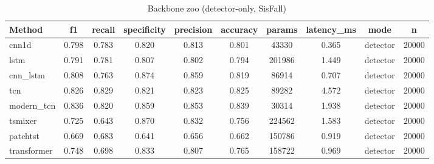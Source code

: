 \begin{table}[t]
\centering
\caption{Backbone zoo (detector-only, SisFall)}
\begin{tabular}{lccccccccc}
\toprule
Method & f1 & recall & specificity & precision & accuracy & params & latency_ms & mode & n \\
\midrule
cnn1d & 0.798 & 0.783 & 0.820 & 0.813 & 0.801 & 43330 & 0.365 & detector & 20000 \\
lstm & 0.791 & 0.781 & 0.807 & 0.802 & 0.794 & 201986 & 1.449 & detector & 20000 \\
cnn_lstm & 0.808 & 0.763 & 0.874 & 0.859 & 0.819 & 86914 & 0.707 & detector & 20000 \\
tcn & 0.826 & 0.829 & 0.821 & 0.823 & 0.825 & 89282 & 4.572 & detector & 20000 \\
modern_tcn & 0.836 & 0.820 & 0.859 & 0.853 & 0.839 & 30314 & 1.938 & detector & 20000 \\
tsmixer & 0.725 & 0.643 & 0.870 & 0.832 & 0.756 & 224562 & 1.583 & detector & 20000 \\
patchtst & 0.669 & 0.683 & 0.641 & 0.656 & 0.662 & 150786 & 0.919 & detector & 20000 \\
transformer & 0.748 & 0.698 & 0.833 & 0.807 & 0.765 & 158722 & 0.969 & detector & 20000 \\
\bottomrule
\end{tabular}
\end{table}